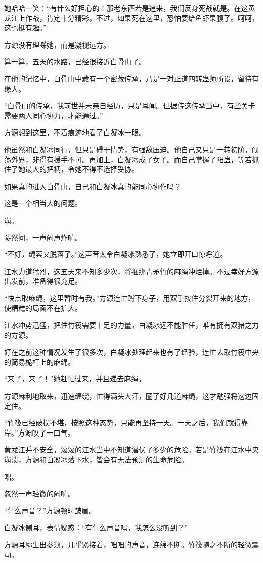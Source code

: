 \begin{this_body}
她哈哈一笑：“有什么好担心的！那老东西若是追来，我们反身死战就是。在这黄龙江上作战，肯定十分精彩。不过，如果死在这里，恐怕要给鱼虾果腹了。呵呵，这也挺有趣。”

方源没有理睬她，而是凝视远方。

算一算，五天的水路，已经很接近白骨山了。

在他的记忆中，白骨山中藏有一个密藏传承，乃是一对正道四转蛊师所设，留待有缘人。

“白骨山的传承，我前世并未亲自经历，只是耳闻。但据传这传承当中，有些关卡需要两人同心协力，才能通过。”

方源想到这里，不着痕迹地看了白凝冰一眼。

他虽然和白凝冰同行，但只是碍于情势，有强敌压迫。他自己又只是一转初阶，闯荡外界，非得有援手不可。再加上，白凝冰成了女子。而自己掌握了阳蛊，等若抓住了她最大的把柄，令她不得不选择妥协。

如果真的进入白骨山，自己和白凝冰真的能同心协作吗？

这是一个相当大的问题。

崩。

陡然间，一声闷声炸响。

“不好，绳索又脱落了。”这声音太令白凝冰熟悉了，她立即开口惊呼道。

江水力道猛烈，这五天来不知多少次，将捆绑青矛竹的麻绳冲烂掉。不过幸好方源出发前，准备得很充足。

“快点取麻绳，这里暂时有我。”方源连忙蹲下身子，用双手按住分裂开来的地方，使糟糕的局面不在扩大。

江水冲势迅猛，把住竹筏需要十足的力量，白凝冰远不能胜任，唯有拥有双猪之力的方源。

好在之前这种情况发生了很多次，白凝冰处理起来也有了经验，连忙去取竹筏中央的简易桅杆上的麻绳。

“来了，来了！”她赶忙过来，并且递去麻绳。

方源麻利地取来，迅速缠绕，忙得满头大汗，圈了好几道麻绳，这才勉强将这边固定住。

“竹筏已经破损不堪，按照这种态势，只能再坚持一天。一天之后，我们就得靠岸。”方源叹了一口气。

黄龙江并不安全，滚滚的江水当中不知道潜伏了多少的危险。若是竹筏在江水中央崩溃，方源和白凝冰落下水，皆会有无法预测的生命危险。

咄。

忽然一声轻微的闷响。

“什么声音？”方源顿时皱眉。

白凝冰侧耳，表情疑惑：“有什么声音吗，我怎么没听到？”

方源耳廓生出参须，几乎紧接着，咄咄的声音，连绵不断。竹筏随之不断的轻微震动。


\end{this_body}
